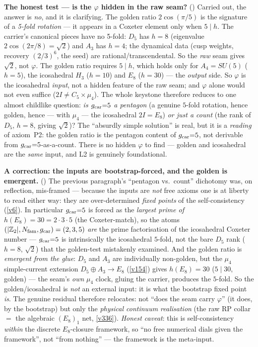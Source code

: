 \par\smallskip\noindent\textbf{The honest test --- is the $\varphi$ hidden in the raw seam?} ()
Carried out, the answer is \emph{no}, and it is clarifying. The golden ratio $2\cos(\pi/5)$ is the signature of a
\emph{5-fold rotation} --- it appears in a Coxeter element only when $5\mid h$. The carrier's canonical pieces have
no 5-fold: $D_5$ has $h{=}8$ (eigenvalue $2\cos(2\pi/8)=\sqrt2$) and $A_3$ has $h{=}4$; the dynamical data (cusp
weights, recovery $(2/3)^6$, the seed) are rational/transcendental. So the \emph{raw} seam gives $\sqrt2$, not
$\varphi$. The golden ratio requires $5\mid h$, which holds only for $A_4{=}SU(5)$ ($h{=}5$), the icosahedral $H_3$
($h{=}10$) and $E_8$ ($h{=}30$) --- the \emph{output} side. So $\varphi$ is the icosahedral \emph{input}, not a
hidden feature of the raw seam; and $\varphi$ alone would not even suffice ($2I\neq C_5\times\mu_4$). The whole
keystone therefore reduces to one almost childlike question: \emph{is $g_{\mathrm{car}}{=}5$ a pentagon} (a genuine $5$-fold
rotation, hence golden, hence --- with $\mu_4$ --- the icosahedral $2I=E_8$) \emph{or just a count} (the rank of
$D_5$, $h{=}8$, giving $\sqrt2$)? The ``absurdly simple solution'' is real, but it is a \emph{reading} of axiom~P2:
the golden ratio is the pentagon content of $g_{\mathrm{car}}{=}5$, not derivable from $g_{\mathrm{car}}{=}5$-as-a-count. There is no
hidden $\varphi$ to find --- golden and icosahedral are the \emph{same} input, and L2 is genuinely foundational.

\par\smallskip\noindent\textbf{A correction: the inputs are bootstrap-forced, and the golden is emergent.}
()
The previous paragraph's ``pentagon vs.\ count'' dichotomy was, on reflection, mis-framed --- because the inputs
are \emph{not} free axioms one is at liberty to read either way: they are over-determined \emph{fixed points} of the
self-consistency (\vref{v6}).  In particular $g_{\mathrm{car}}{=}5$ is forced as the \emph{largest prime of} $h(E_8)=30=2{\cdot}3{\cdot}5$
(the Coxeter-match), so the atoms $(|\mathbb Z_2|,N_{\mathrm{fam}},g_{\mathrm{car}})=(2,3,5)$ \emph{are} the prime factorisation of the
icosahedral Coxeter number --- $g_{\mathrm{car}}{=}5$ is intrinsically the icosahedral $5$-fold, not the bare $D_5$ rank
($h{=}8$, $\sqrt2$) that the golden-test mistakenly examined. And the golden ratio is \emph{emergent from the glue}:
$D_5$ and $A_3$ are individually non-golden, but the $\mu_4$ simple-current extension $D_5\!\oplus\!A_3\to E_8$
(\vref{v154}) gives $h(E_8)=30$ ($5\mid30$, golden) --- the seam's \emph{own} $\mu_4$ clock, gluing the carrier,
produces the $5$-fold.  So the golden/icosahedral is \emph{not} an external input: it is what the bootstrap fixed
point \emph{is}.  The genuine residual therefore relocates: not ``does the seam carry $\varphi$'' (it does, by the
bootstrap) but only the \emph{physical continuum realisation} (the raw RP collar $=$ the algebraic $(E_8)_1$ net,
\vref{v336}).  \emph{Honest caveat}: this is self-consistency \emph{within} the discrete $E_8$-closure framework, so
``no free numerical dials given the framework'', not ``from nothing'' --- the framework is the meta-input.

